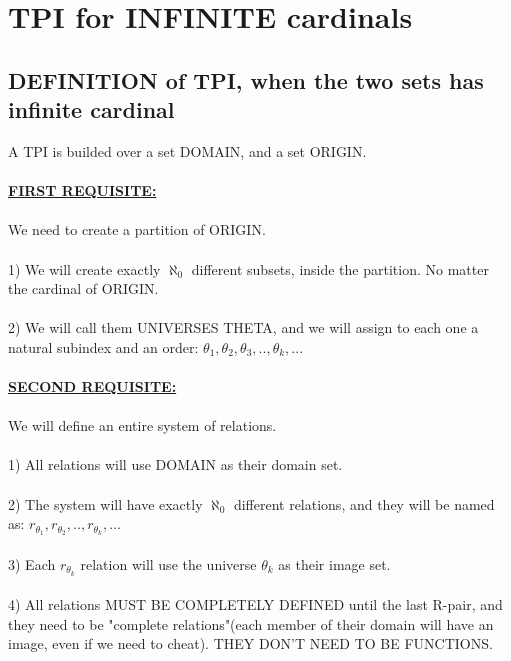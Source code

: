 \chapter{ TPI for INFINITE cardinals}

	\section{DEFINITION of TPI, when the two sets has infinite cardinal}
	
		\noindent
		A TPI is builded over a set DOMAIN, and a set ORIGIN.
		\\\\
		
		\noindent
		\underline{\textbf{FIRST REQUISITE:}}\\\\
		We need to create a partition of ORIGIN.\\\\
		1) We will create exactly $\aleph_{0}$ different subsets, inside the partition. No matter the cardinal of ORIGIN.\\\\
		2) We will call them UNIVERSES THETA, and we will assign to each one a natural subindex and an order: $\theta_{1}, \theta_{2}, \theta_{3}, .. , \theta_{k}, ..$.
		\\\\
		
		\noindent
		\underline{\textbf{SECOND REQUISITE:}}\\\\
		We will define an entire system of relations.\\\\
		1) All relations will use DOMAIN as their domain set.\\\\
		2) The system will have exactly $\aleph_{0}$ different relations, and they will be named as: $r_{\theta_{1}}, r_{\theta_{2}}, .. , r_{\theta_{k}}, ..$.\\\\ 
		3) Each $r_{\theta_{k}}$ relation will use the universe $\theta_{k}$ as their image set.\\\\
		4) All relations MUST BE COMPLETELY DEFINED until the last R-pair, and they need to be "complete relations"(each member of their domain will have an image, even if we need to cheat). THEY DON'T NEED TO BE FUNCTIONS.
		\\\\
		
